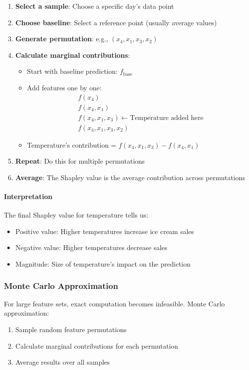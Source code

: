 \documentclass{article}
\begin{document}
\begin{enumerate}
    \item \textbf{Select a sample}: Choose a specific day's data point
    \item \textbf{Choose baseline}: Select a reference point (usually average values)
    \item \textbf{Generate permutation}: e.g., $(x_4, x_1, x_3, x_2)$
    \item \textbf{Calculate marginal contributions}:
    \begin{itemize}
        \item Start with baseline prediction: $f_\text{base}$
        \item Add features one by one:
            \begin{align*}
                &f(x_4) \\
                &f(x_4, x_1) \\
                &f(x_4, x_1, x_3) \leftarrow \text{Temperature added here} \\
                &f(x_4, x_1, x_3, x_2)
            \end{align*}
        \item Temperature's contribution = $f(x_4, x_1, x_3) - f(x_4, x_1)$
    \end{itemize}
    \item \textbf{Repeat}: Do this for multiple permutations
    \item \textbf{Average}: The Shapley value is the average contribution across permutations
\end{enumerate}

\paragraph{Interpretation}
The final Shapley value for temperature tells us:
\begin{itemize}
    \item Positive value: Higher temperatures increase ice cream sales
    \item Negative value: Higher temperatures decrease sales
    \item Magnitude: Size of temperature's impact on the prediction
\end{itemize}

\subsubsection{Monte Carlo Approximation}
For large feature sets, exact computation becomes infeasible. Monte Carlo approximation:
\begin{enumerate}
    \item Sample random feature permutations
    \item Calculate marginal contributions for each permutation
    \item Average results over all samples
\end{enumerate}
\end{document}
